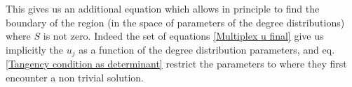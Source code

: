 \documentclass[
11pt, %
english, %
singlespacing, %
liststotoc, %
headsepline, %
]{MastersDoctoralThesis} %
\begin{document}
This gives us an additional equation which allows in principle to find the boundary of the region (in the space of parameters of the degree distributions) where $S$ is not zero. Indeed the set of equations \eqref{Multiplex u final} give us implicitly the $u_j$ as a function of the degree distribution parameters, and eq. \eqref{Tangency condition as determinant} restrict the parameters to where they first encounter a non trivial solution.


\appendix %



\printbibliography[heading=bibintoc]

\end{document}
